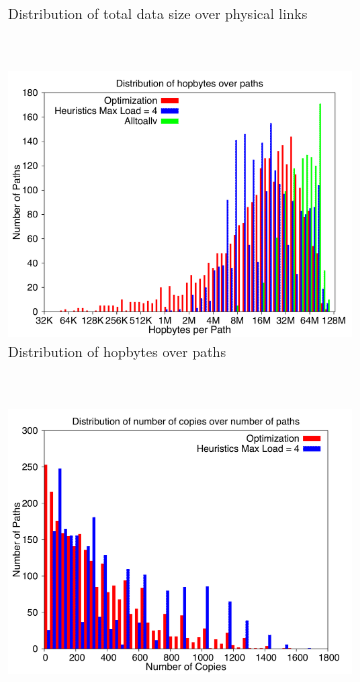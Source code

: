 \begin{figure}[!htbp]
\begin{subfigure}[b]{0.49\textwidth}
                \caption{Distribution of total data size over physical links}
                \label{fig:27_2048_loaddata}
        \end{subfigure}
        ~ %
        \begin{subfigure}[b]{0.49\textwidth}
                \includegraphics[width=\textwidth]{report_figures/constantr/27_2048/hopbyte_histo.pdf}
                \caption{Distribution of hopbytes over paths}
                \label{fig:27_2048_hopbyte}
        \end{subfigure}
        ~ %
        \begin{subfigure}[b]{0.49\textwidth}
                \includegraphics[width=\textwidth]{report_figures/constantr/27_2048/hopcopy_histo.pdf}

\end{subfigure}
\end{figure}
